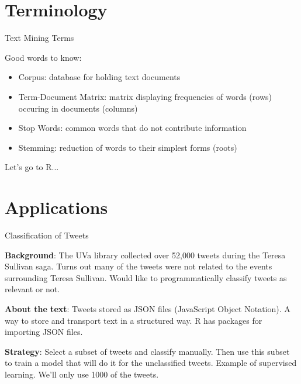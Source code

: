\documentclass[xcolor=dvipsnames]{beamer}
\newcommand{\bi}{\begin{itemize}}
\newcommand{\ei}{\end{itemize}}
\newcommand{\+}{\item}
\begin{document}
\section{Terminology}

\begin{frame}{Text Mining Terms}

Good words to know:

\bi
	\+ Corpus: database for holding text documents
	\+ Term-Document Matrix: matrix displaying frequencies of words (rows) occuring in documents (columns)
	\+ Stop Words: common words that do not contribute information
	\+ Stemming: reduction of words to their simplest forms (roots)
\ei

\pause

Let's go to R...

\end{frame}

\section{Applications}


\begin{frame}{Classification of Tweets}

{\bf Background}: The UVa library collected over 52,000 tweets during the Teresa Sullivan saga. Turns out many of the tweets were not related to the events surrounding Teresa Sullivan. Would like to programmatically classify tweets as relevant or not. 

\pause

{\bf About the text}: Tweets stored as JSON files (JavaScript Object Notation). A way to store and transport text in a structured way.  R has packages for importing JSON files. 

\pause 

{\bf Strategy}: Select a subset of tweets and classify manually. Then use this subset to train a model that will do it for the unclassified tweets. Example of supervised learning. We'll only use 1000 of the tweets.



\end{frame}
\end{document}
